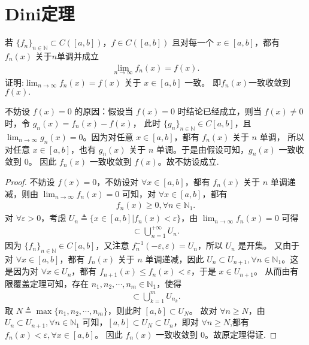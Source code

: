 \documentclass[../../main.tex]{subfiles}
\begin{document}
\section{Dini定理}

\begin{theorem}[Dini定理]\label{theorem:Dini定理(数分版本)}
若 \(\{f_n\}_{n\in\mathbb{N}}\subset C([a,b])\)，\(f\in C([a,b])\) 且对每一个 \(x\in [a,b]\)，都有 \(f_n(x)\) 关于$n$单调并成立
\begin{align*}
\lim_{n\rightarrow\infty}f_n(x)=f(x).
\end{align*}
证明:\(\lim_{n\rightarrow\infty}f_n(x)=f(x)\) 关于 \(x\in [a,b]\) 一致。 即$f_n(x)$一致收敛到$f(x).$
\end{theorem}
\begin{remark}
不妨设 \(f(x) = 0\) 的原因：假设当 \(f(x) = 0\) 时结论已经成立，则当 \(f(x)\ne 0\) 时，令 \(g_n(x)=f_n(x)-f(x)\)，
此时 \(\{g_n\}_{n\in \mathbb{N}}\in C[a,b]\)，且 \(\lim_{n\rightarrow \infty}g_n(x)=0\)。因为对任意 \(x\in [a,b]\)，都有 \(f_n(x)\) 关于 \(n\) 单调，
所以对任意 \(x\in [a,b]\)，也有 \(g_n(x)\) 关于 \(n\) 单调。于是由假设可知，\(g_n(x)\) 一致收敛到 \(0\)。
因此 \(f_n(x)\) 一致收敛到 \(f(x)\)。故不妨设成立.
\end{remark}
\begin{proof}
不妨设 \(f(x) = 0\)，不妨设对 \(\forall x\in [a,b]\)，都有 \(f_n(x)\) 关于 \(n\) 单调递减，则由 \(\lim_{n\rightarrow \infty}f_n(x)=0\) 可知，对 \(\forall x\in [a,b]\)，都有
\begin{align*}
f_n(x)\geqslant 0,\forall n\in \mathbb{N}_1.
\end{align*}
对 \(\forall \varepsilon>0\)，考虑 \(U_n\triangleq \{x\in [a,b]|f_n(x)<\varepsilon\}\)，由 \(\lim_{n\rightarrow \infty}f_n(x)=0\) 可得
\begin{align*}
[a,b]\subset \bigcup_{n = 1}^{+\infty}U_n.
\end{align*}
因为 \(\{f_n\}_{n\in \mathbb{N}}\in C[a,b]\)，又注意 \(f_{n}^{-1}(-\varepsilon,\varepsilon)=U_n\)，所以 \(U_n\) 是开集。
又由于对 \(\forall x\in [a,b]\)，都有 \(f_n(x)\) 关于 \(n\) 单调递减，因此 \(U_n\subset U_{n + 1},\forall n\in \mathbb{N}_1\)。这是因为对 \(\forall x\in U_n\)，都有 \(f_{n + 1}(x)\leqslant f_n(x)<\varepsilon\)，于是 \(x\in U_{n + 1}\)。
从而由有限覆盖定理可知，存在 \(n_1,n_2,\cdots,n_m\in \mathbb{N}_1\)，使得
\begin{align*}
[a,b]\subset \bigcup_{k = 1}^mU_{n_k}.
\end{align*}
取 \(N\triangleq \max\{n_1,n_2,\cdots,n_m\}\)，则此时 \([a,b]\subset U_N\)。
故对 \(\forall n\geqslant N\)，由 \(U_n\subset U_{n + 1},\forall n\in \mathbb{N}_1\) 可知，\([a,b]\subset U_N\subset U_n\)，即对 \(\forall n\geqslant N\),都有 \(f_n(x)<\varepsilon,\forall x\in [a,b]\)。
因此 \(f_n(x)\) 一致收敛到 $0$。故原定理得证. 

\end{proof}
\end{document}
